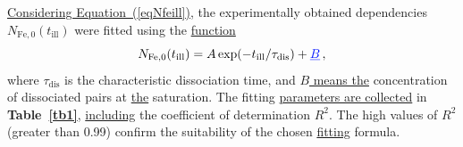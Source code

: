 \documentclass{WileyMSP-template}
\begin{document}
\textcolor[rgb]{0.00,0.07,1.00}{\uline{Considering Equation~(\ref{eqNfeill})}}, the experimentally obtained dependencies $N_\mathrm{Fe,0}(t_\mathrm{ill})$ were fitted using the \textcolor[rgb]{0.00,0.07,1.00}{\uline{function}}
\begin{equation}
\label{eqNfe0Exp}
N_\mathrm{Fe,0}(t_\mathrm{ill})=A\exp(-t_\mathrm{ill}/\tau_\mathrm{dis})
+\textcolor[rgb]{0.00,0.07,1.00}{\uline{B}}\,,
\end{equation}
where
$\tau_\mathrm{dis}$ is the characteristic dissociation time,
and \textcolor[rgb]{0.00,0.07,1.00}{\uline{$B$ means the}} concentration of dissociated pairs at \textcolor[rgb]{0.00,0.07,1.00}{\uline{the}} saturation.
The fitting \textcolor[rgb]{0.00,0.07,1.00}{\uline{parameters are collected}} in \textbf{Table~\ref{tb1}},
\textcolor[rgb]{0.00,0.07,1.00}{\uline{including}} the coefficient of determination $R^2$.
The high values of $R^2$ (greater than 0.99) confirm the suitability of the chosen \textcolor[rgb]{0.00,0.07,1.00}{\uline{fitting}} formula.
\end{document}
